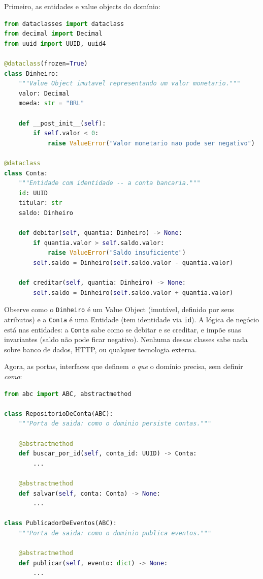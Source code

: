 Primeiro, as entidades e value objects do domínio:

\begin{lstlisting}[language=Python, caption={Domínio -- Entidades e Value Objects}]
from dataclasses import dataclass
from decimal import Decimal
from uuid import UUID, uuid4

@dataclass(frozen=True)
class Dinheiro:
    """Value Object imutavel representando um valor monetario."""
    valor: Decimal
    moeda: str = "BRL"

    def __post_init__(self):
        if self.valor < 0:
            raise ValueError("Valor monetario nao pode ser negativo")

@dataclass
class Conta:
    """Entidade com identidade -- a conta bancaria."""
    id: UUID
    titular: str
    saldo: Dinheiro

    def debitar(self, quantia: Dinheiro) -> None:
        if quantia.valor > self.saldo.valor:
            raise ValueError("Saldo insuficiente")
        self.saldo = Dinheiro(self.saldo.valor - quantia.valor)

    def creditar(self, quantia: Dinheiro) -> None:
        self.saldo = Dinheiro(self.saldo.valor + quantia.valor)
\end{lstlisting}

Observe como o \texttt{Dinheiro} é um Value Object (imutável, definido por
seus atributos) e a \texttt{Conta} é uma Entidade (tem identidade via
\texttt{id}). A lógica de negócio está nas entidades: a \texttt{Conta} sabe
como se debitar e se creditar, e impõe suas invariantes (saldo não pode ficar
negativo). Nenhuma dessas classes sabe nada sobre banco de dados, HTTP, ou
qualquer tecnologia externa.

Agora, as portas, interfaces que definem \textit{o que} o domínio precisa,
sem definir \textit{como}:

\begin{lstlisting}[language=Python, caption={Portas -- Interfaces do Domínio}]
from abc import ABC, abstractmethod

class RepositorioDeConta(ABC):
    """Porta de saida: como o dominio persiste contas."""

    @abstractmethod
    def buscar_por_id(self, conta_id: UUID) -> Conta:
        ...

    @abstractmethod
    def salvar(self, conta: Conta) -> None:
        ...

class PublicadorDeEventos(ABC):
    """Porta de saida: como o dominio publica eventos."""

    @abstractmethod
    def publicar(self, evento: dict) -> None:
        ...
\end{lstlisting}

